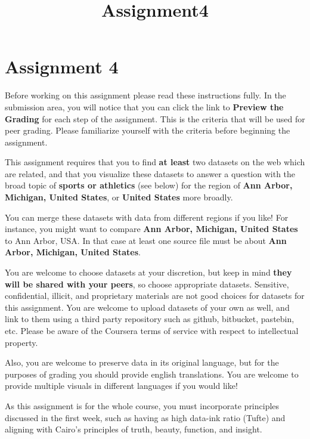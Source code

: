 \documentclass[11pt]{article}
\title{Assignment4}
\begin{document}
    
    
    \maketitle
    
    

    
    \section{Assignment 4}\label{assignment-4}

Before working on this assignment please read these instructions fully.
In the submission area, you will notice that you can click the link to
\textbf{Preview the Grading} for each step of the assignment. This is
the criteria that will be used for peer grading. Please familiarize
yourself with the criteria before beginning the assignment.

This assignment requires that you to find \textbf{at least} two datasets
on the web which are related, and that you visualize these datasets to
answer a question with the broad topic of \textbf{sports or athletics}
(see below) for the region of \textbf{Ann Arbor, Michigan, United
States}, or \textbf{United States} more broadly.

You can merge these datasets with data from different regions if you
like! For instance, you might want to compare \textbf{Ann Arbor,
Michigan, United States} to Ann Arbor, USA. In that case at least one
source file must be about \textbf{Ann Arbor, Michigan, United States}.

You are welcome to choose datasets at your discretion, but keep in mind
\textbf{they will be shared with your peers}, so choose appropriate
datasets. Sensitive, confidential, illicit, and proprietary materials
are not good choices for datasets for this assignment. You are welcome
to upload datasets of your own as well, and link to them using a third
party repository such as github, bitbucket, pastebin, etc. Please be
aware of the Coursera terms of service with respect to intellectual
property.

Also, you are welcome to preserve data in its original language, but for
the purposes of grading you should provide english translations. You are
welcome to provide multiple visuals in different languages if you would
like!

As this assignment is for the whole course, you must incorporate
principles discussed in the first week, such as having as high data-ink
ratio (Tufte) and aligning with Cairo's principles of truth, beauty,
function, and insight.
\end{document}
